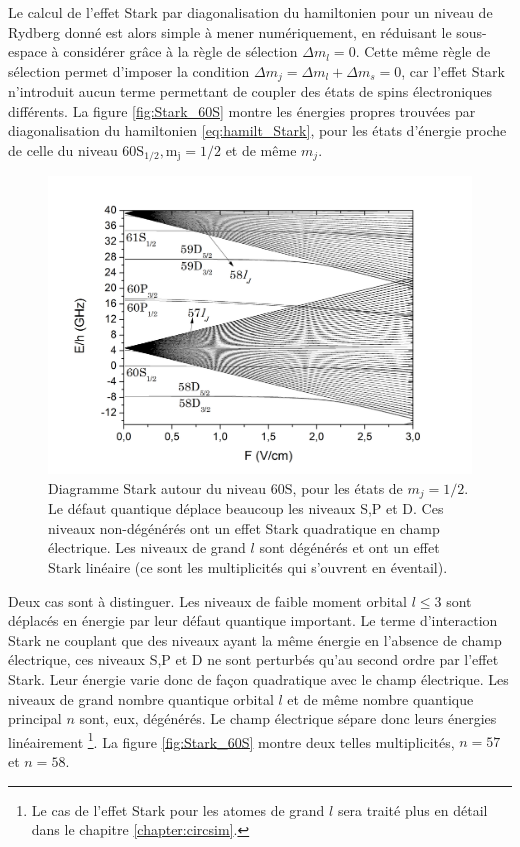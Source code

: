 Le calcul de l'effet Stark par diagonalisation du hamiltonien pour un niveau de Rydberg donné est alors simple à mener numériquement, en réduisant le sous-espace à considérer grâce à la règle de sélection $\Delta m_l = 0$.
Cette même règle de sélection permet d'imposer la condition $\Delta m_j= \Delta m_l + \Delta m_s = 0$, car l'effet Stark n'introduit aucun terme permettant de coupler des états de spins électroniques différents.
La figure \eqref{fig:Stark_60S} montre les énergies propres trouvées par diagonalisation du hamiltonien \eqref{eq:hamilt_Stark}, pour les états d'énergie proche de celle du niveau $\mathrm{60S_{1/2},m_j=1/2}$ et de même $m_j$.
%
\begin{figure}[!h]
\centering
\includegraphics[width=\linewidth]{figures/setup/rydberg/Stark_60S}
\caption[Diagramme Stark autour du niveau $\mathrm{60S}$]{
Diagramme Stark autour du niveau $\mathrm{60S}$, pour les états de $m_j=1/2$.
Le défaut quantique déplace beaucoup les niveaux S,P et D.
Ces niveaux non-dégénérés ont un effet Stark quadratique en champ électrique.
Les niveaux de grand $l$ sont dégénérés et ont un effet Stark linéaire (ce sont les multiplicités qui s'ouvrent en éventail).
}
\label{fig:Stark_60S}
\end{figure}
%
Deux cas sont à distinguer. Les niveaux de faible moment orbital $l\leq 3$ sont déplacés en énergie par leur défaut quantique important.
Le terme d'interaction Stark ne couplant que des niveaux ayant la même énergie en l'absence de champ électrique, ces niveaux S,P et D ne sont perturbés qu'au second ordre par l'effet Stark.
Leur énergie varie donc de façon quadratique avec le champ électrique.
Les niveaux de grand nombre quantique orbital $l$ et de même nombre quantique principal $n$ sont, eux, dégénérés.
Le champ électrique sépare donc leurs énergies linéairement
\footnote{
Le cas de l'effet Stark pour les atomes de grand $l$ sera traité plus en détail dans le chapitre \ref{chapter:circsim}.
}.
La figure \eqref{fig:Stark_60S} montre deux telles multiplicités, $n=57$ et $n=58$.

